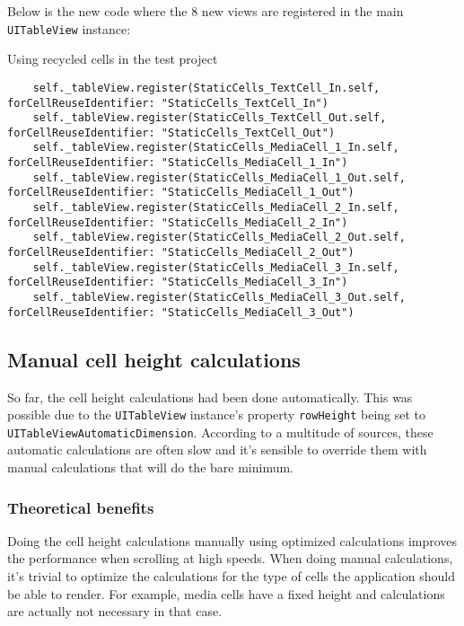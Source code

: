 \documentclass[a4paper,12pt]{article}
\begin{document}
Below is the new code where the 8 new views are registered in the main \texttt{UITableView} instance:
\begin{listing}[H]
  \caption{Using recycled cells in the test project}
  \begin{verbatim}
    self._tableView.register(StaticCells_TextCell_In.self, forCellReuseIdentifier: "StaticCells_TextCell_In")
    self._tableView.register(StaticCells_TextCell_Out.self, forCellReuseIdentifier: "StaticCells_TextCell_Out")
    self._tableView.register(StaticCells_MediaCell_1_In.self, forCellReuseIdentifier: "StaticCells_MediaCell_1_In")
    self._tableView.register(StaticCells_MediaCell_1_Out.self, forCellReuseIdentifier: "StaticCells_MediaCell_1_Out")
    self._tableView.register(StaticCells_MediaCell_2_In.self, forCellReuseIdentifier: "StaticCells_MediaCell_2_In")
    self._tableView.register(StaticCells_MediaCell_2_Out.self, forCellReuseIdentifier: "StaticCells_MediaCell_2_Out")
    self._tableView.register(StaticCells_MediaCell_3_In.self, forCellReuseIdentifier: "StaticCells_MediaCell_3_In")
    self._tableView.register(StaticCells_MediaCell_3_Out.self, forCellReuseIdentifier: "StaticCells_MediaCell_3_Out")
  \end{verbatim}
\end{listing}

\subsection{Manual cell height calculations}\label{subsection:ManualCellHeightCalculations}
So far, the cell height calculations had been done automatically. This was possible due to the \texttt{UITableView} instance's property \texttt{rowHeight} being set to \texttt{UITableViewAutomaticDimension}. According to a multitude of sources, these automatic calculations are often slow and it's sensible to override them with manual calculations that will do the bare minimum.\cite{PerfectSmoothScrollingInUITableViews}\cite{HowToMakeDynamicTableViewCellHeight}

\subsubsection*{Theoretical benefits}
Doing the cell height calculations manually using optimized calculations improves the performance when scrolling at high speeds. When doing manual calculations, it's trivial to optimize the calculations for the type of cells the application should be able to render. For example, media cells have a fixed height and calculations are actually not necessary in that case.
\end{document}
